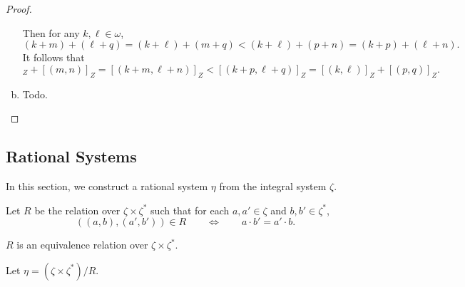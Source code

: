 \documentclass[11pt]{article}
\begin{document}
\begin{proof}
\begin{enumerate}[(a)]
    Then for any $k, \ell \in \omega$,
    \begin{equation*}
      (k + m) + (\ell + q)
      = (k + \ell) + (m + q)
      < (k + \ell) + (p + n)
      = (k + p) + (\ell + n).
    \end{equation*}
    It follows that
    \begin{equation*}
      [(k, \ell)]_Z + [(m, n)]_Z
      = [(k + m, \ell + n)]_Z
      < [(k + p, \ell + q)]_Z
      = [(k, \ell)]_Z + [(p, q)]_Z.
    \end{equation*}
    \item Todo.
    \qedhere
  \end{enumerate}
\end{proof}

\subsection{Rational Systems}
In this section, we construct a rational system $\eta$ from the integral system $\zeta$.

\begin{definition}
  Let $R$ be the relation over $\zeta \times \zeta^*$ such that for each $a, a' \in \zeta$ and $b, b' \in \zeta^*$,
  \begin{equation*}
    ((a, b), (a', b')) \in R \qquad \iff \qquad a \cdot b' = a' \cdot b.
  \end{equation*}
\end{definition}

\begin{proposition}
  $R$ is an equivalence relation over $\zeta \times \zeta^*$.
\end{proposition}

\begin{definition}
  Let $\eta = (\zeta \times \zeta^*) / R$.
\end{definition}
\end{document}
